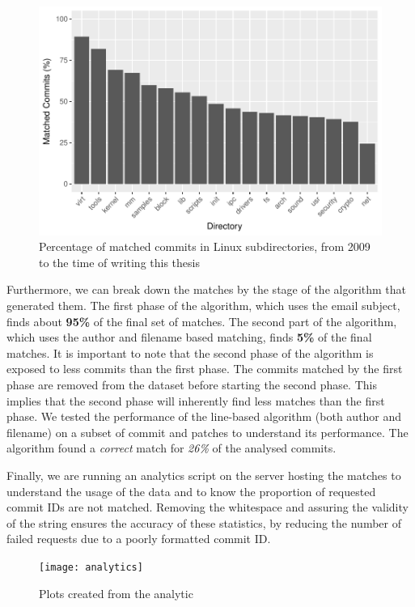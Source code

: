 \begin{figure}[htb]
\centering
\includegraphics[width=5in]{plots/matched_commits_dir}
\caption{Percentage of matched commits in Linux subdirectories, from 2009 to the time of writing this thesis}
\label{fig:matched_proportions}
\end{figure}

Furthermore, we can break down the matches by the stage of the algorithm that generated them. The first phase of the algorithm, which uses the email subject, finds about \textbf{95\%} of the final set of matches. The second part of the algorithm, which uses the author and filename based matching, finds \textbf{5\%} of the final matches. It is important to note that the second phase of the algorithm is exposed to less commits than the first phase. The commits matched by the first phase are removed from the dataset before starting the second phase. This implies that the second phase will inherently find less matches than the first phase. We tested the performance of the line-based algorithm (both author and filename) on a subset of commit and patches to understand its performance. The algorithm found a \textit{correct} match for \textit{26\%} of the analysed commits.



Finally, we are running an analytics script on the server hosting the matches to understand the usage of the data and to know the proportion of requested commit IDs are not matched. Removing the whitespace and assuring the validity of the string ensures the accuracy of these statistics, by reducing the number of failed requests due to a poorly formatted commit ID.

\begin{figure}[htb]
\centering
\texttt{[image: analytics]}
\caption{Plots created from the analytic}
\label{fig:analytics}
\end{figure}

